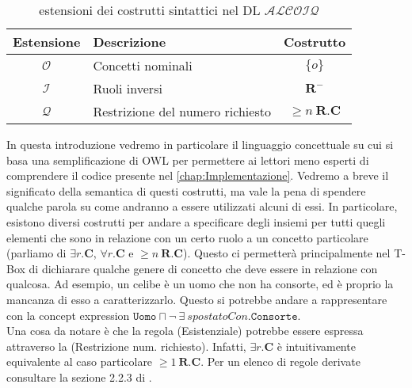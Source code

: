 \begin{table}
	\centering
	\begin{tabular}{c l c}
		\hline
		Estensione & Descrizione & Costrutto \\
		\hline
		$\mathcal{O}$ & Concetti nominali & $\{o\}$\\
		$\mathcal{I}$ & Ruoli inversi & $ \mathbf{R} ^-$\\
		$\mathcal{Q}$ & Restrizione del numero richiesto & $\ge n\ \mathbf{R} . \mathbf{C} $\\
		
		\hline
	\end{tabular}
	\caption{estensioni dei costrutti sintattici nel DL $\mathcal{ALCOIQ}$}
	\label{tab:ALCOIQExtensions}
\end{table}
In questa introduzione vedremo in particolare il linguaggio concettuale su cui si basa una semplificazione di OWL per permettere ai lettori meno esperti di comprendere il codice presente nel \autoref{chap:Implementazione}.
\noindent
Vedremo a breve il significato della semantica di questi costrutti, ma vale la pena di spendere qualche parola su come andranno a essere utilizzati alcuni di essi. In particolare, esistono diversi costrutti per andare a specificare degli insiemi per tutti quegli elementi che sono in relazione con un certo ruolo a un concetto particolare (parliamo di $\exists r. \mathbf{C}$,  $\forall r. \mathbf{C}$ e $\ge n\ \mathbf{R} . \mathbf{C}$). Questo ci permetterà principalmente nel T-Box di dichiarare qualche genere di concetto che deve essere in relazione con qualcosa. Ad esempio, un celibe è un uomo che non ha consorte, ed è proprio la mancanza di esso a caratterizzarlo. Questo si potrebbe andare a rappresentare con la concept expression $\texttt{Uomo}\sqcap \neg\ \exists\ \textit{spostatoCon}. \texttt{Consorte}$.\\
Una cosa da notare è che la regola (Esistenziale) potrebbe essere espressa attraverso la (Restrizione num. richiesto). Infatti, $\exists r. \mathbf{C}$ è intuitivamente equivalente al caso particolare $\ge 1\ \mathbf{R}. \mathbf{C}$. Per un elenco di regole derivate consultare la sezione 2.2.3 di \cite{leinbergerphdthesis}.


